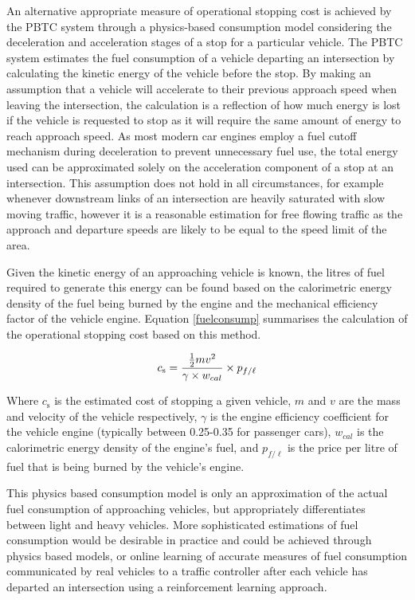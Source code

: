 An alternative appropriate measure of operational stopping cost is achieved by the PBTC system through a physics-based consumption model considering the deceleration and acceleration stages of a stop for a particular vehicle. The PBTC system estimates the fuel consumption of a vehicle departing an intersection by calculating the kinetic energy of the vehicle before the stop. By making an assumption that a vehicle will accelerate to their previous approach speed when leaving the intersection, the calculation is a reflection of how much energy is lost if the vehicle is requested to stop as it will require the same amount of energy to reach approach speed. As most modern car engines employ a fuel cutoff mechanism during deceleration to prevent unnecessary fuel use, the total energy used can be approximated solely on the acceleration component of a stop at an intersection. This assumption does not hold in all circumstances, for example whenever downstream links of an intersection are heavily saturated with slow moving traffic, however it is a reasonable estimation for free flowing traffic as the approach and departure speeds are likely to be equal to the speed limit of the area. 

Given the kinetic energy of an approaching vehicle is known, the litres of fuel required to generate this energy can be found based on the calorimetric energy density of the fuel being burned by the engine and the mechanical efficiency factor of the vehicle engine. Equation \ref{fuelconsump} summarises the calculation of the operational stopping cost based on this method.

\begin{align}
	\centering
		c_\text{s} = {\frac{\frac{1}{2}m{v}^{2} }{\gamma \times w_{cal}}} \times {p_{f\text{/}\ell}}
	\label{fuelconsump}
\end{align}

Where $c_\text{s}$ is the estimated cost of stopping a given vehicle, $m$ and $v$ are the mass and velocity of the vehicle respectively, $\gamma$ is the engine efficiency coefficient for the vehicle engine (typically between 0.25-0.35 for passenger cars), $w_{cal}$ is the calorimetric energy density of the engine's fuel, and $p_{f\text{/}\ell}$ is the price per litre of fuel that is being burned by the vehicle's engine.

This physics based consumption model is only an approximation of the actual fuel consumption of approaching vehicles, but appropriately differentiates between light and heavy vehicles. More sophisticated estimations of fuel consumption would be desirable in practice and could be achieved through physics based models, or online learning of accurate measures of fuel consumption communicated by real vehicles to a traffic controller after each vehicle has departed an intersection using a reinforcement learning approach.

